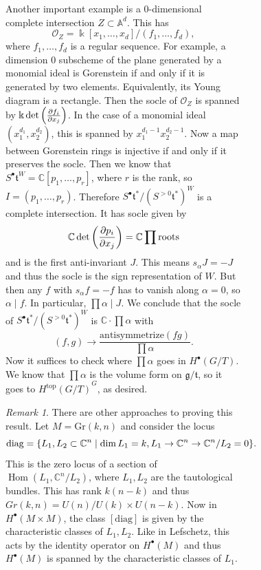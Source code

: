 \documentclass[leqno, openany]{memoir}
\theoremstyle{definition}
\theoremstyle{remark}
\newtheorem{rmk}[thm]{Remark}
\theoremstyle{plain}
\theoremstyle{definition}
\theoremstyle{remark}
\newcommand{\A}{\mathbb{A}}
\newcommand{\C}{\mathbb{C}}
\renewcommand{\k}{\Bbbk}
\newcommand{\mc}[1]{\mathcal{#1}}
\newcommand{\mf}[1]{\mathfrak{#1}}
\newcommand{\mr}[1]{\mathrm{#1}}
\DeclareMathOperator{\Hom}{Hom}
\begin{document}
\begin{figure}[H]
\begin{figure}[H]
Another important example is a $0$-dimensional complete intersection $Z \subset
\A^d$. This has \[ \mc{O}_Z = \k[x_1, \ldots, x_d]/(f_1, \ldots, f_d), \] where
$f_1, \ldots, f_d$ is a regular sequence. For example, a dimension $0$
subscheme of the plane generated by a monomial ideal is Gorenstein if and only
if it is generated by two elements. Equivalently, its Young diagram is a
rectangle. Then the socle of $\mc{O}_Z$ is spanned by $\k \det \qty(
\pdv{f_i}{x_j} )$. In the case of a monomial ideal $(x_1^{d_1}, x_2^{d_2})$,
this is spanned by $x_1^{d_1-1} x_2^{d_2-1}$. Now a map between Gorenstein
rings is injective if and only if it preserves the socle. Then we know that
$S^{\bullet} \mf{t}^W = \C[p_1, \ldots, p_r]$, where $r$ is the rank, so $I =
(p_1, \ldots, p_r)$. Therefore $S^{\bullet} \mf{t}^* / {(S^{>0}\mf{t}^*)}^W$ is
a complete intersection. It has socle given by \[ \C \det \qty( \pdv{p_i}{x_j}
) = \C \prod \text{roots} \] and is the first anti-invariant $J$. This means
$s_{\alpha} J = -J$ and thus the socle is the sign representation of $W$. But
then any $f$ with $s_{\alpha} f = -f$ has to vanish along $\alpha = 0$, so
$\alpha \mid f$. In particular, $\prod \alpha \mid J$. We conclude that the
socle of $S^{\bullet} \mf{t}^* / {(S^{>0} \mf{t}^*)}^W$ is $\C \cdot \prod
\alpha$ with \[ (f,g) \to \frac{\text{antisymmetrize}(fg)}{\prod \alpha}. \]
Now it suffices to check where $\prod \alpha$ goes in $H^{\bullet}(G/T)$. We
know that $\prod \alpha$ is the volume form on $\mf{g}/\mf{t}$, so it goes to
${ H^{\mr{top}}(G/T) }^G$, as desired.

\begin{rmk} There are other approaches to proving this result. Let $M =
    \mr{Gr}(k, n)$ and consider the locus \[ \text{diag} = \qty{L_1, L_2
    \subset \C^n \mid \dim L_1 = k, L_1 \to \C^n \to \C^n/L_2 = 0}. \] This is
    the zero locus of a section of $\Hom(L_1, \C^n/L_2)$, where $L_1, L_2$ are
    the tautological bundles. This has rank $k(n-k)$ and thus $Gr(k, n) =
    U(n)/U(k) \times U(n-k)$. Now in $H^{\bullet}(M \times M)$, the class
    $[\text{diag}]$ is given by the characteristic classes of $L_1, L_2$. Like
    in Lefschetz, this acts by the identity operator on $H^{\bullet}(M)$ and
    thus $H^{\bullet}(M)$ is spanned by the characteristic classes of $L_1$.
\end{rmk}


\end{figure}
\end{figure}
\end{document}

